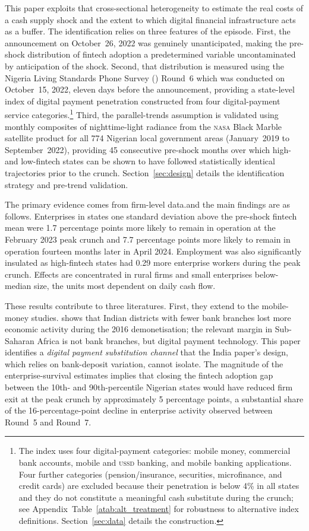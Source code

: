 This paper exploits that cross-sectional heterogeneity to estimate the real
costs of a cash supply shock and the extent to which digital financial
infrastructure acts as a buffer. The identification relies on three features
of the episode. First, the \CBN{} announcement on October~26, 2022 was
genuinely unanticipated, making the pre-shock distribution of fintech
adoption a predetermined variable uncontaminated by anticipation of the shock.
Second, that distribution is measured using the Nigeria Living Standards
Phone Survey (\NLPS) Round~6 which was conducted on October~15, 2022, eleven days
before the announcement, providing a state-level index of digital payment
penetration constructed from four digital-payment service categories.\footnote{%
  The index uses four digital-payment categories: mobile money, commercial
  bank accounts, mobile and \textsc{ussd} banking, and mobile banking
  applications. Four further categories (pension/insurance, securities,
  microfinance, and credit cards) are excluded because their penetration is
  below 4\% in all states and they do not constitute a meaningful cash
  substitute during the crunch; see Appendix~Table~\ref{atab:alt_treatment}
  for robustness to alternative index definitions.
  Section~\ref{sec:data} details the construction.}
Third, the parallel-trends assumption is validated using monthly composites of
nighttime-light radiance from the \textsc{nasa} \VIIRS{} Black Marble satellite
product for all 774 Nigerian local government areas (January~2019 to
September~2022), providing 45 consecutive pre-shock months over which
high- and low-fintech states can be shown to have followed statistically
identical trajectories prior to the crunch. Section~\ref{sec:design} details
the identification strategy and pre-trend validation.

The primary evidence comes from firm-level data.and the main findings are as follows.
Enterprises in states one standard deviation above the pre-shock fintech
mean were 1.7 percentage points more likely to remain in operation at the
February 2023 peak crunch and 7.7 percentage points more likely
to remain in operation fourteen months later in April 2024.
Employment was also significantly insulated as high-fintech states had
0.29 more enterprise workers during the peak crunch. 
Effects are concentrated in rural firms and small enterprises below-median
size, the units most dependent on daily cash flow.

These results contribute to three literatures. First, they extend
\citet{chodorow2020cash} to the mobile-money studies. \citet{chodorow2020cash} shows that
Indian districts with fewer bank branches lost more economic activity during
the 2016 demonetisation; the relevant margin in Sub-Saharan Africa is not bank
branches, but digital payment technology.
This paper identifies a \emph{digital payment substitution channel} that the
India paper's design, which relies on bank-deposit variation, cannot isolate.
The magnitude of the enterprise-survival estimates implies that closing the
fintech adoption gap between the 10th- and 90th-percentile Nigerian states
would have reduced firm exit at the peak crunch by approximately 5 percentage
points, a substantial share of the 16-percentage-point decline in enterprise
activity observed between Round~5 and Round~7.

